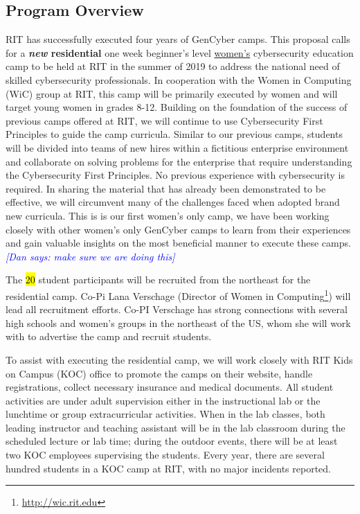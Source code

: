 \documentclass[12pt]{article}
\newcommand{\dan}[1]{\textcolor{blue}{{\it [Dan says: #1]}}}
\begin{document}
\subsection{Program Overview}
RIT has successfully executed four years of GenCyber camps. This proposal calls for a \textbf{\emph{new} residential} one week beginner's level \ul{women's} cybersecurity education camp to be held at RIT in the summer of 2019 to address the national need of skilled cybersecurity professionals. In cooperation with the Women in Computing (WiC) group at RIT, this camp will be primarily executed by women and will target young women in grades 8-12. Building on the foundation of the success of previous camps offered at RIT, we will continue to use Cybersecurity First Principles to guide the camp curricula. Similar to our previous camps, students will be divided into teams of new hires within a fictitious enterprise environment and collaborate on solving problems for the enterprise that require understanding the Cybersecurity First Principles. No previous experience with cybersecurity is required. In sharing the material that has already been demonstrated to be effective, we will circumvent many of the challenges faced when adopted brand new curricula. This is is our first women's only camp, we have been working closely with other women's only GenCyber camps to learn from their experiences and gain valuable insights on the most beneficial manner to execute these camps. \dan{make sure we are doing this}

The \hl{20} student participants will be recruited from the northeast for the residential camp. Co-Pi Lana Verschage (Director of Women in Computing\footnote{\url{http://wic.rit.edu}}) will lead all recruitment efforts. Co-PI Verschage has strong connections with several high schools and women's groups in the northeast of the US, whom she will work with to advertise the camp and recruit students.


To assist with executing the residential camp, we will work closely with RIT Kids on Campus (KOC) office to promote the camps on their website, handle registrations, collect necessary insurance and medical documents. All student activities are under adult supervision either in the instructional lab or the lunchtime or group extracurricular activities. When in the lab classes, both leading instructor and teaching assistant will be in the lab classroom during the scheduled lecture or lab time; during the outdoor events, there will be at least two KOC employees supervising the students. Every year, there are several hundred students in a KOC camp at RIT, with no major incidents reported.
\end{document}
